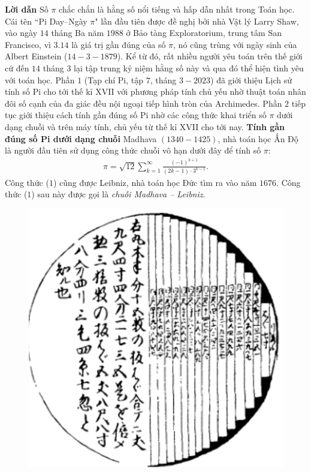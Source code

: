 \begin{multicols}{2}
	\textbf{\color{lichsutoanhoc}Lời dẫn}
	\vskip 0.1cm
	Số $\pi$ chắc chắn là hằng số nổi tiếng và hấp dẫn nhất trong Toán học. 
	\vskip 0.1cm
	Cái tên ``Pi Day--Ngày $\pi$" lần đầu tiên được đề nghị bởi nhà Vật lý Larry Shaw, vào ngày $14$ tháng Ba năm $1988$ ở Bảo tàng Exploratorium, trung tâm San Francisco, vì $3.14$ là giá trị gần đúng của số $\pi$, nó cũng trùng với ngày sinh của Albert Einstein ($14-3-1879$). Kể từ đó, rất nhiều người yêu toán trên thế giới cứ đến $14$ tháng $3$ lại tập trung kỷ niệm hằng số này và qua đó thể hiện tình yêu với toán học. 
	\vskip 0.1cm
	Phần $1$ (Tạp chí Pi, tập $7$, tháng $3-2023$) đã giới thiệu Lịch sử tính số Pi cho tới thế kỉ XVII với phương pháp tính chủ yếu nhờ thuật toán nhân đôi số cạnh của đa giác đều nội ngoại tiếp hình tròn của Archimedes. Phần $2$ tiếp tục giới thiệu cách tính gần đúng số Pi nhờ các công thức khai triển số $\pi$ dưới dạng chuỗi và trên máy tính, chủ yếu từ thế kỉ XVII cho tới nay.
	\vskip 0.1cm
	\textbf{\color{lichsutoanhoc}Tính gần đúng số Pi dưới dạng chuỗi}
	\vskip 0.1cm
	Madhava $(1340-1425)$, nhà toán học Ấn Độ là người đầu tiên sử dụng công thức chuỗi vô hạn dưới đây để tính số $\pi$: 
	\begin{align*}
		\pi  = \sqrt {12} \sum\limits_{k = 1}^\infty  {\frac{{{{\left( { - 1} \right)}^{k + 1}}}}{{\left( {2k - 1} \right) \cdot {3^{k - 1}}}}}. \tag{$1$}
	\end{align*}
	Công thức ($1$) cũng được Leibniz, nhà toán học Đức tìm ra vào năm $1676$. Công thức ($1$) sau này được gọi là \textit{chuỗi Madhava -- Leibniz}.
	\begin{figure}[H]
		\vspace*{-5pt}
		\centering
		\captionsetup{labelformat= empty, justification=centering}
		\includegraphics[width= 1\linewidth]{1}

\end{figure}
\end{multicols}
